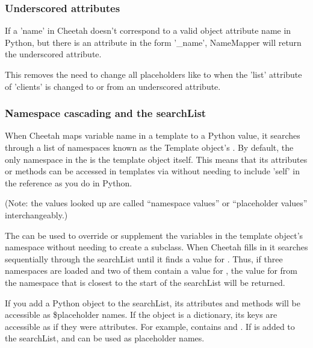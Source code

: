 \subsubsection{Underscored attributes}
\label{language.namemapper.underscore}

If a 'name' in Cheetah doesn't correspond to a valid object attribute name in
Python, but there is an attribute in the form '\_name', NameMapper will return
the underscored attribute.

This removes the need to change all placeholders like  to
 when the 'list' attribute of 'clients' is changed to or
from an underscored attribute.


\subsubsection{Namespace cascading and the searchList}
\label{language.namemapper.searchList}

When Cheetah maps variable name in a template to a Python value, it searches
through a list of namespaces known as the Template object's .
By default, the only namespace in the  is the template object
itself. This means that its attributes or methods can be accessed in templates
via  without needing to include 'self' in the reference as
you do in Python. 

(Note: the values looked up are called ``namespace values'' or 
``placeholder values'' interchangeably.)

The  can be used to override or supplement the variables in the
template object's namespace without needing to create a subclass.  When Cheetah
fills in  it searches sequentially through the searchList until it
finds a value for .  Thus, if three namespaces are loaded and two of
them contain a value for , the value for  from the
namespace that is closest to the start of the searchList will be returned.

If you add a Python object to the searchList, its attributes and methods will
be accessible as \$placeholder names.  If the object is a dictionary, its keys
are accessible as if they were attributes.  For example, 
contains  and .  If  is added to
the searchList,  and  can be used as
placeholder names.

